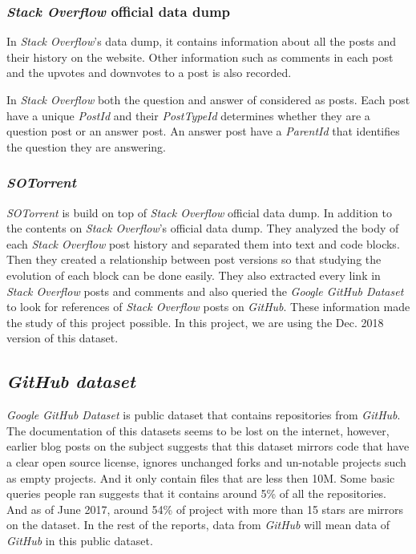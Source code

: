 \documentclass[sigconf]{acmart}
\begin{document}
\subsubsection{\textit{Stack Overflow} official data dump}

In \textit{Stack Overflow}'s data dump, it contains information about all the posts and their history on the website. Other information such as comments in each post and the upvotes and downvotes to a post is also recorded.

In \textit{Stack Overflow} both the question and answer of considered as posts. Each post have a unique \textit{PostId} and their \textit{PostTypeId} determines whether they are a question post or an answer post. An answer post have a \textit{ParentId} that identifies the question they are answering. 

\subsubsection{\textit{SOTorrent}}

\textit{SOTorrent} is build on top of \textit{Stack Overflow} official data dump. In addition to the contents on \textit{Stack Overflow}'s official data dump. They analyzed the body of each \textit{Stack Overflow} post history and separated them into text and code blocks. Then they created a relationship between post versions so that studying the evolution of each block can be done easily. They also extracted every link in \textit{Stack Overflow} posts and comments and also queried the \textit{Google GitHub Dataset} to look for references of \textit{Stack Overflow} posts on \textit{GitHub}. These information made the study of this project possible. In this project, we are using the Dec. 2018 version of this dataset.

\subsection{\textit{GitHub dataset}}
\textit{Google GitHub Dataset} is public dataset that contains repositories from \textit{GitHub}. The documentation of this datasets seems to be lost on the internet, however, earlier blog posts on the subject suggests that this dataset mirrors code that have a clear open source license, ignores unchanged forks and un-notable projects such as empty projects. And it only contain files that are less then 10M. Some basic queries people ran suggests that it contains around 5\% of all the repositories. And as of June 2017, around 54\% of project with more than 15 stars are mirrors on the dataset. In the rest of the reports, data from \textit{GitHub} will mean data of \textit{GitHub} in this public dataset.
\end{document}
